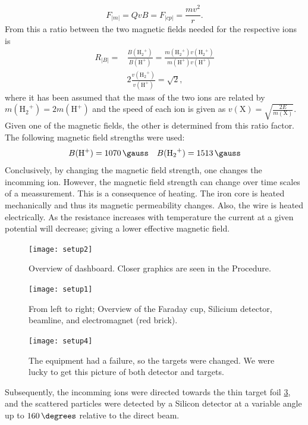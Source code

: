 \begin{equation}
F_|m| = QvB = F_|cp| = \frac{mv^2}{r}.
\end{equation}
From this a ratio between the two magnetic fields needed for the respective
ions is
\begin{align}
    R_|B| = & \frac{B({\mathrm{H_2}^+})}{B(\mathrm{H^+})} =
    \frac{m({\mathrm{H_2}^+})
    v({\mathrm{H_2}^+})}{m(\mathrm{H^+})v(\mathrm{H^+})}\\
    & 2 \frac{v({\mathrm{H_2}^+})}{v(\mathrm{H^+})} = \sqrt{2},
\end{align}
%
where it has been assumed that the mass of the two ions are related by
$m(\mathrm{{H_2}^+}) = 2m(\mathrm{H^+}) $ and the speed of each ion is given as
$v(\mathrm{X}) = \sqrt{\frac{2E}{m(\mathrm{X})}}$.
%
Given one of the magnetic fields, the other is determined from this ratio
factor. The following magnetic field strengths were used:
%
\begin{equation}
    B(\mathrm{H^+}) = \SI{1070}{\gauss} \quad B(\mathrm{{H_2}^+}) = \SI{1513}{\gauss}
\end{equation}
%
Conclusively, by changing the magnetic field strength, one changes the
incomming ion. However, the magnetic field strength can change over time scales
of a meassurement. This is a consequence of heating. The iron core is heated
mechanically and thus its magnetic permeability changes. Also, the wire is
heated electrically. As the resistance increases with temperature the
current at a given potential will decrease; giving a lower effective magnetic
field.

%
\begin{figure}[t]
    \centering
    \texttt{[image: setup2]}
    \caption{Overview of dashboard. Closer graphics are seen in the Procedure.}
    \label{fig_setup2}
\end{figure}
%
\begin{figure}[t]
    \centering
    \texttt{[image: setup1]}
    \caption{From left to right; Overview of the Faraday cup, Silicium detector, beamline, and electromagnet (red brick).}
    \label{fig_setup1}
\end{figure}
%
\begin{figure}[t]
    \centering
    \texttt{[image: setup4]}
    \caption{The equipment had a failure, so the targets were changed. We were
    lucky to get this picture of both detector and targets.}
    \label{fig_setup4}
\end{figure}
%
Subsequently, the incomming ions were directed towards the thin target foil
\cref{fig_setup4}, and the scattered particles were detected by a Silicon
detector at a variable angle up to $\SI{160}{\degrees}$ relative to the
direct beam. 

